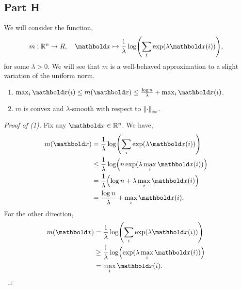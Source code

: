\documentclass{tufte-handout}
\begin{document}
\subsection{Part H}
We will consider the function, \begin{align}
    m : \R^n \to R,\quad \vx \mapsto \frac{1}{\lambda}\log\parentheses*{\sum_i \exp(\lambda \vx(i))},
\end{align} for some $\lambda > 0$. We will see that $m$ is a well-behaved approximation to a slight variation of the uniform norm.

\begin{lem}\label{lem:part:2H}
\leavevmode\begin{enumerate}
    \item $\max_i \vx(i) \leq m(\vx) \leq \frac{\log n}{\lambda} + \max_i \vx(i)$.
    \item $m$ is convex and $\lambda$-smooth with respect to $\left\| \cdot \right\|_\infty$.
\end{enumerate}
\end{lem}
\begin{proof}[Proof of (1)] Fix any $\vx \in \R^n$. We have, \begin{align*}
    m(\vx) &= \frac{1}{\lambda}\log\parentheses*{\sum_i \exp(\lambda \vx(i))} \\
    &\leq \frac{1}{\lambda}\log\parentheses*{n \exp(\lambda \max_i \vx(i))} \\
    &= \frac{1}{\lambda}\parentheses*{\log n + \lambda \max_i \vx(i)} \\
    &= \frac{\log n}{\lambda} + \max_i \vx(i).
\end{align*} For the other direction, \begin{align*}
    m(\vx) &= \frac{1}{\lambda}\log\parentheses*{\sum_i \exp(\lambda \vx(i))} \\
    &\geq \frac{1}{\lambda}\log\parentheses*{\exp(\lambda \max_i \vx(i))} \\
    &= \max_i \vx(i). \qedhere
\end{align*}
\end{proof}
\end{document}

